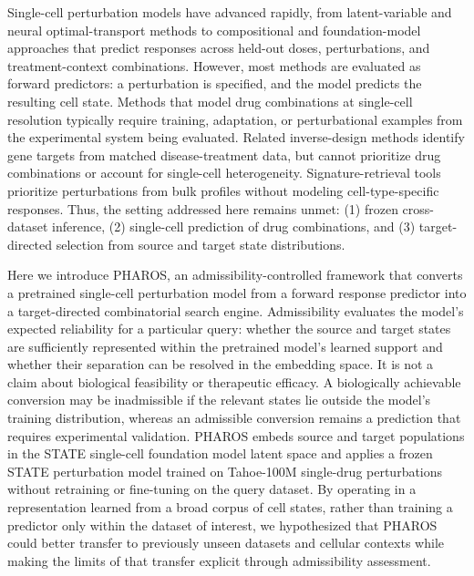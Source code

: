 \documentclass[11pt,a4paper]{article}
\begin{document}
Single-cell perturbation models have advanced rapidly, from latent-variable and neural optimal-transport methods to compositional and foundation-model approaches that predict responses across held-out doses, perturbations, and treatment-context combinations\cite{Lotfollahi2019, Bunne2023, Dong2023, Chen2025, Lotfollahi2023, Yu2025, Cui2024, Adduri2025, Dong2026}. However, most methods are evaluated as forward predictors: a perturbation is specified, and the model predicts the resulting cell state. Methods that model drug combinations at single-cell resolution typically require training, adaptation, or perturbational examples from the experimental system being evaluated\cite{Lotfollahi2023,Driessen2026,Wei2025}. Related inverse-design methods identify gene targets from matched disease-treatment data\cite{Gonzalez2025}, but cannot prioritize drug combinations or account for single-cell heterogeneity. Signature-retrieval tools prioritize perturbations from bulk profiles without modeling cell-type-specific responses\cite{Duan2016}. Thus, the setting addressed here remains unmet: (1) frozen cross-dataset inference, (2) single-cell prediction of drug combinations, and (3) target-directed selection from source and target state distributions.

Here we introduce PHAROS, an admissibility-controlled framework that converts a pretrained single-cell perturbation model from a forward response predictor into a target-directed combinatorial search engine. Admissibility evaluates the model’s expected reliability for a particular query: whether the source and target states are sufficiently represented within the pretrained model’s learned support and whether their separation can be resolved in the embedding space. It is not a claim about biological feasibility or therapeutic efficacy. A biologically achievable conversion may be inadmissible if the relevant states lie outside the model’s training distribution, whereas an admissible conversion remains a prediction that requires experimental validation. PHAROS embeds source and target populations in the STATE single-cell foundation model latent space and applies a frozen STATE perturbation model trained on Tahoe-100M single-drug perturbations without retraining or fine-tuning on the query dataset\cite{Adduri2025,Zhang2025}. By operating in a representation learned from a broad corpus of cell states, rather than training a predictor only within the dataset of interest, we hypothesized that PHAROS could better transfer to previously unseen datasets and cellular contexts while making the limits of that transfer explicit through admissibility assessment.
\end{document}
